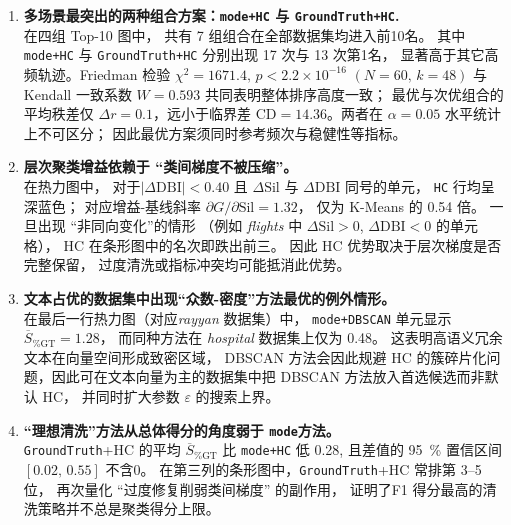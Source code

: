 \documentclass[10pt]{article} %
\numberwithin{equation}{section}
\begin{document}
\begin{enumerate}[label=\textbf{\arabic*.},leftmargin=2.6em]

\item \textbf{多场景最突出的两种组合方案：\texttt{mode+HC} 与 \texttt{GroundTruth+HC}.}\\
在四组 Top-10 图中，
共有 \num{7} 组组合在全部数据集均进入前10名。
其中 \texttt{mode+HC} 与 \texttt{GroundTruth+HC}
分别出现 \num{17} 次与 \num{13} 次第1名，
显著高于其它高频轨迹。Friedman 检验
\(\chi^{2}=\num{1671.4},\,p<2.2\times10^{-16}\)  
\((N=\num{60},\,k=\num{48})\) 与 Kendall 一致系数
\(W=\num{0.593}\) 共同表明整体排序高度一致；
最优与次优组合的平均秩差仅
\(\Delta r=\num{0.1}\)，远小于临界差
\(\mathrm{CD}=\num{14.36}\)。两者在 \(\alpha=0.05\) 水平统计上不可区分；
因此最优方案须同时参考频次与稳健性等指标。

\item \textbf{层次聚类增益依赖于 “类间梯度不被压缩”。}\\
在热力图中，
对于\(|\Delta\text{DBI}|<\num{0.40}\) 且
\(\Delta\text{Sil}\) 与 \(\Delta\text{DBI}\) 同号的单元，
\texttt{HC} 行均呈深蓝色；
对应增益-基线斜率
\(\partial G/\partial\text{Sil}=\num{1.32}\)，
仅为 K-Means 的 \num{0.54} 倍。
一旦出现 “非同向变化”的情形
（例如 \emph{flights} 中 \(\Delta\text{Sil}>0\),
 \(\Delta\text{DBI}<0\) 的单元格），
HC 在条形图中的名次即跌出前三。
因此 HC 优势取决于层次梯度是否完整保留，
过度清洗或指标冲突均可能抵消此优势。

\item \textbf{文本占优的数据集中出现“众数-密度”方法最优的例外情形。}\\
在最后一行热力图（对应\emph{rayyan} 数据集）中，
\texttt{mode+DBSCAN} 单元显示
\(\overline{S}_{\%\mathrm{GT}}=\num{1.28}\)，
而同种方法在 \emph{hospital} 数据集上仅为 \num{0.48}。
这表明高语义冗余文本在向量空间形成致密区域，
DBSCAN 方法会因此规避 HC 的簇碎片化问题，因此可在文本向量为主的数据集中把 DBSCAN 方法放入首选候选而非默认 HC，
并同时扩大参数 \(\varepsilon\) 的搜索上界。

\item \textbf{“理想清洗”方法从总体得分的角度弱于 \texttt{mode}方法。}\\
\texttt{GroundTruth}+HC 的平均
\(\overline{S}_{\%\mathrm{GT}}\) 比
\texttt{mode+HC} 低 \num{0.28},
且差值的 \SI{95}{\percent} 置信区间
\([0.02,\,0.55]\) 不含0。
在第三列的条形图中，\texttt{GroundTruth}+HC
常排第 \numrange{3}{5} 位，
再次量化 “过度修复削弱类间梯度” 的副作用，
证明了F1 得分最高的清洗策略并不总是聚类得分上限。
\end{enumerate}
\end{document}
